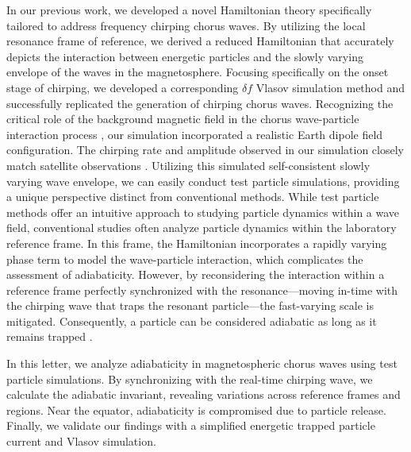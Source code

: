 In our previous work, we developed a novel Hamiltonian theory \cite{zheng2024} specifically tailored to address frequency chirping chorus waves.
By utilizing the local resonance frame of reference, we derived a reduced Hamiltonian that accurately depicts the interaction between energetic particles and the slowly varying envelope of the waves in the magnetosphere.
Focusing specifically on the onset stage of chirping, we developed a corresponding  $\delta f$ Vlasov simulation method and successfully replicated the generation of chirping chorus waves.
Recognizing the critical role of the background magnetic field in the chorus wave-particle interaction process \cite{wu2023,wu_controlling_2020}, our simulation incorporated a realistic Earth dipole field configuration.
The chirping rate and amplitude observed in our simulation closely match satellite observations \cite{cully_observational_2011}. 
Utilizing this simulated self-consistent slowly varying wave envelope, we can easily conduct test particle simulations, providing a unique perspective distinct from conventional methods.
While test particle methods \cite{huanghua_test_ptc,omura_test_ptc,tao_test_ptc} offer an intuitive approach to studying particle dynamics within a wave field, conventional studies often analyze particle dynamics within the laboratory reference frame. In this frame, the Hamiltonian incorporates  a rapidly varying phase term to model the wave-particle interaction, which complicates the assessment of adiabaticity. However, by reconsidering the interaction within a reference frame perfectly synchronized with the resonance—moving in-time with the chirping wave that traps the resonant particle—the fast-varying scale is mitigated. Consequently, a particle can be considered adiabatic as long as it remains trapped  \cite{CARY1989287}.

In this letter, we analyze adiabaticity in magnetospheric chorus waves using test particle simulations. By synchronizing with the real-time chirping wave, we calculate the adiabatic invariant, revealing variations across reference frames and regions. Near the equator, adiabaticity is compromised due to particle release. Finally, we validate our findings with a simplified energetic trapped particle current and Vlasov simulation.

